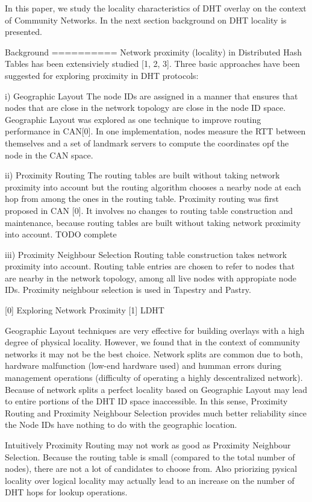 In this paper, we study the locality characteristics of DHT overlay on the context of Community 
Networks. In the next section background on DHT locality is presented.


Background
==========
Network proximity (locality) in Distributed Hash Tables has been extensiviely studied [1, 2, 3]. 
Three basic approaches have been suggested for exploring proximity in DHT protocols:

i) Geographic Layout
The node IDs are assigned in a manner that ensures that nodes that are close in the 
network topology are close in the node ID space. Geographic Layout was explored as 
one technique to improve routing performance in CAN[0]. In one implementation, 
nodes measure the RTT between themselves and a set of landmark servers to compute 
the coordinates opf the node in the CAN space.

ii) Proximity Routing
The routing tables are built without taking network proximity into account but the 
routing algorithm chooses a nearby node at each hop from among the ones in the 
routing table. Proximity routing was first proposed in CAN [0]. It involves no 
changes to routing table construction and maintenance, because routing tables are 
built without taking network proximity into account. TODO complete

iii) Proximity Neighbour Selection
Routing table construction takes network proximity into account. Routing table 
entries are chosen to refer to nodes that are nearby in the network topology, 
among all live nodes with appropiate node IDs. Proximity neighbour selection is 
used in Tapestry and Pastry.

[0] Exploring Network Proximity
[1] LDHT

Geographic Layout techniques are very effective for building overlays with a 
high degree of physical locality. However, we found that in the context of 
community networks it may not be the best choice. Network splits are common due to both, 
hardware malfunction (low-end hardware used) and humman errors during management 
operations (difficulty of operating a highly descentralized network). Because of network 
splits a perfect locality based on Geographic Layout may lead to entire portions of the DHT ID space inaccessible. 
In this sense, Proximity Routing and Proximity Neighbour Selection provides much better 
reliability since the Node IDs have nothing to do with the geographic location.

Intuitively Proximity Routing may not work as good as Proximity Neighbour Selection. 
Because the routing table is small (compared to the total number of nodes), there 
are not a lot of candidates to choose from. Also priorizing pysical locality over 
logical locality may actually lead to an increase on the number of DHT hops for 
lookup operations.

